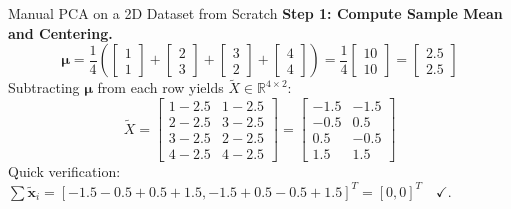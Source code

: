 \begin{examplebox}{Manual PCA on a 2D Dataset from Scratch}
\textbf{Step 1: Compute Sample Mean and Centering.}
\begin{equation}
\boldsymbol{\mu} = \frac{1}{4} \left( \begin{bmatrix} 1 \\ 1 \end{bmatrix} + \begin{bmatrix} 2 \\ 3 \end{bmatrix} + \begin{bmatrix} 3 \\ 2 \end{bmatrix} + \begin{bmatrix} 4 \\ 4 \end{bmatrix} \right) = \frac{1}{4} \begin{bmatrix} 10 \\ 10 \end{bmatrix} = \begin{bmatrix} 2.5 \\ 2.5 \end{bmatrix}
\end{equation}
Subtracting $\boldsymbol{\mu}$ from each row yields $\tilde{X} \in \mathbb{R}^{4 \times 2}$:
\begin{equation}
\tilde{X} = \begin{bmatrix} 1 - 2.5 & 1 - 2.5 \\ 2 - 2.5 & 3 - 2.5 \\ 3 - 2.5 & 2 - 2.5 \\ 4 - 2.5 & 4 - 2.5 \end{bmatrix} = \begin{bmatrix} -1.5 & -1.5 \\ -0.5 & 0.5 \\ 0.5 & -0.5 \\ 1.5 & 1.5 \end{bmatrix}
\end{equation}
Quick verification: $\sum \tilde{\mathbf{x}}_i = [-1.5 - 0.5 + 0.5 + 1.5, -1.5 + 0.5 - 0.5 + 1.5]^T = [0, 0]^T \quad \checkmark$.


\end{examplebox}
